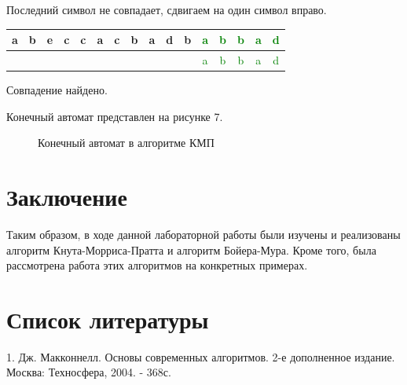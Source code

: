 \documentclass[a4paper,14pt]{report}
\begin{document}
Последний символ не совпадает, сдвигаем на один символ вправо.

\begin{table}[h]
		\begin{tabular}{| c | c | c | c | c | c | c | c | c | c | c | c | c | c | c | c |}
	 	\hline
		a & b & e & c & c & a & c & b & a & d & b & \textcolor{green}{a} & \textcolor{green}{b} & \textcolor{green}{b} & \textcolor{green}{a} & \textcolor{green}{d} \\ \hline
     &  &  &  &  &  &  &  &  &  &  & \textcolor{green}{a} & \textcolor{green}{b} & \textcolor{green}{b} & \textcolor{green}{a} & \textcolor{green}{d} \\ \hline
		\end{tabular}
\end{table}

Совпадение найдено.

Конечный автомат представлен на рисунке 7.

\begin{figure}[!h]
\caption{Конечный автомат в алгоритме КМП}
\label{fig:image}
\end{figure}

\chapter*{Заключение}

Таким образом, в ходе данной лабораторной работы были изучены и реализованы алгоритм Кнута-Морриса-Пратта и алгоритм Бойера-Мура.
Кроме того, была рассмотрена работа этих алгоритмов на конкретных примерах.

\chapter*{Список литературы}

1. Дж. Макконнелл. Основы  современных  алгоритмов. 2-е дополненное  издание. Москва: Техносфера,  2004.  -   368с.
\end{document}
